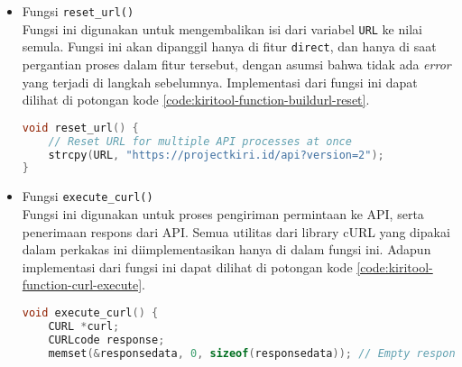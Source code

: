 \begin{itemize}[listparindent=\parindent]
\begin{lstlisting}[language=C, caption=Implementasi fungsi build\textunderscore url\textunderscore findroute(), label=code:kiritool-function-buildurl-findroute]
    // End location check
    if (strcmp(finish, "\0") == 0) {
        error = 1;
        fputs("\nError:\n", stderr);

        if (locale == 1) {
            fputs("You did not input the coordinates of the end location.\n", stderr);
            fputs("Please input the coordinates of the end location through the corresponding option.\n", stderr);
        }
        else {
            fputs("Anda belum memasukkan sebuah koordinat untuk lokasi akhir.\n", stderr);
            fputs("Mohon masukkan koordinat untuk lokasi akhir pencarian rute melalui opsi yang sesuai.\n", stderr);
        }
        exit(1);
    }
    else {
        strcat(URL, "&finish=");
        strcat(URL, finish);
    }

    strcat(URL, "&presentation=desktop");
    strcat(URL, "&apikey=68CD281C8A8EE97C");
}
	\end{lstlisting}
	
	\item Fungsi \verb|reset_url()| \\
	Fungsi ini digunakan untuk mengembalikan isi dari variabel \verb|URL| ke nilai semula. Fungsi ini akan dipanggil hanya di fitur \verb|direct|, dan hanya di saat pergantian proses dalam fitur tersebut, dengan asumsi bahwa tidak ada \textit{error} yang terjadi di langkah sebelumnya. Implementasi dari fungsi ini dapat dilihat di potongan kode \ref{code:kiritool-function-buildurl-reset}.
	
	\begin{lstlisting}[language=C, caption=Implementasi fungsi reset\textunderscore url(), label=code:kiritool-function-buildurl-reset]
void reset_url() {
    // Reset URL for multiple API processes at once
    strcpy(URL, "https://projectkiri.id/api?version=2");
}
	\end{lstlisting}
	
	\item Fungsi \verb|execute_curl()| \\
	Fungsi ini digunakan untuk proses pengiriman permintaan ke API, serta penerimaan respons dari API. Semua utilitas dari library cURL yang dipakai dalam perkakas ini diimplementasikan hanya di dalam fungsi ini. Adapun implementasi dari fungsi ini dapat dilihat di potongan kode \ref{code:kiritool-function-curl-execute}.
	
	\begin{lstlisting}[language=C, caption=Implementasi fungsi execute\textunderscore curl(), label=code:kiritool-function-curl-execute]
void execute_curl() {
    CURL *curl;
    CURLcode response;
    memset(&responsedata, 0, sizeof(responsedata)); // Empty response data chunk for multiprocess modes


\end{lstlisting}
\end{itemize}
